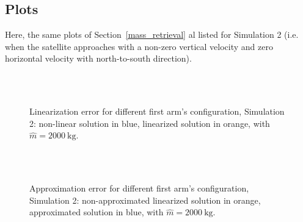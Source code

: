 \documentclass[a4paper,12pt,oneside]{report}
\begin{document}
\begin{appendices}
\chapter{Plots}\label{appendix_plots}
Here, the same plots of Section~\ref{mass_retrieval} al listed for Simulation 2 (i.e. when the satellite approaches with a non-zero vertical velocity and zero horizontal velocity with north-to-south direction).
\begin{figure}[h]
  \centering
  \subfloat[\emph{$q_{2,0}=\SI{0}{\radian}$}]{} \quad
  \subfloat[\emph{$q_{2,0}=\SI[parse-numbers = false]{\pi/6}{\radian}$}]{}\\
  \subfloat[\emph{$q_{2,0}=\SI[parse-numbers = false]{\pi/4}{\radian}$}]{}\quad
  \subfloat[\emph{$q_{2,0}=\SI[parse-numbers = false]{\pi/3}{\radian}$}]{}\\
  \subfloat[\emph{$q_{2,0}=\SI[parse-numbers = false]{\pi/2}{\radian}$}]{}
  \caption{Linearization error for different first arm's configuration, Simulation 2: non-linear solution in blue, linearized solution in orange, with $\hat{m}=\SI{2000}{\kilogram}$.}
  \label{linear_error_2}
\end{figure}
\begin{figure}[!h]
  \centering
  \subfloat[\emph{$q_{2,0}=\SI{0}{\radian}$}]{} \quad
  \subfloat[\emph{$q_{2,0}=\SI[parse-numbers = false]{\pi/6}{\radian}$}]{}\\
  \subfloat[\emph{$q_{2,0}=\SI[parse-numbers = false]{\pi/4}{\radian}$}]{}\quad
  \subfloat[\emph{$q_{2,0}=\SI[parse-numbers = false]{\pi/3}{\radian}$}]{}\\
  \subfloat[\emph{$q_{2,0}=\SI[parse-numbers = false]{\pi/2}{\radian}$}]{}
  \caption{Approximation error for different first arm's configuration, Simulation 2: non-approximated linearized solution in orange, approximated solution in blue, with $\hat{m}=\SI{2000}{\kilogram}$.}
  \label{approximation_error_2}
\end{figure}
\begin{figure}[h!]
  \centering
  
  \caption{}
  \label{q262}
\end{figure}
\begin{figure}[h!]
  \centering
  
  \caption{}
  \label{q242}
\end{figure}
\begin{figure}[h!]
  \centering
  
  \caption{}
  \label{q232}
\end{figure}
\begin{figure}[h!]
  \centering
  
  \caption{}
  \label{q222}
\end{figure}
\end{appendices}
\nocite{*}
{}

\end{document}
